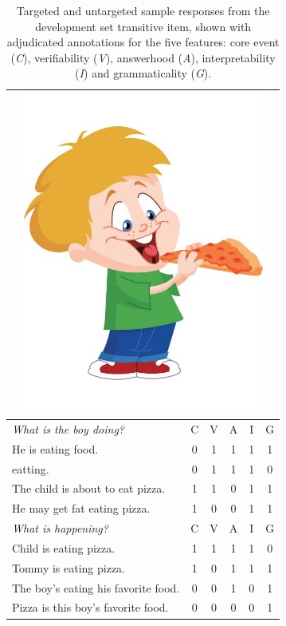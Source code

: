 \begin{table}[htb!]
\begin{center}
\begin{tabular}{|l|c|c|c|c|c|}
\hline
\multicolumn{6}{|c|}{\includegraphics[width=0.45\columnwidth]{figures/I02.jpg}} \\
\hline
\textit{What is the boy doing?} & C & V & A & I & G \\
\hline
\hline
He is eating food. & 0 & 1 & 1 & 1 & 1 \\
\hline
eatting. & 0 & 1 & 1 & 1 & 0 \\
\hline
The child is about to eat pizza. & 1 & 1 & 0 & 1 & 1 \\
\hline
He may get fat eating pizza. & 1 & 0 & 0 & 1 & 1 \\
\hline
\hline
\hline
\textit{What is happening?} & C & V & A & I & G \\
\hline
\hline
Child is eating pizza. & 1 & 1 & 1 & 1 & 0 \\
\hline
Tommy is eating pizza. & 1 & 0 & 1 & 1 & 1 \\
\hline
The boy's eating his favorite food. & 0 & 0 & 1 & 0 & 1 \\
\hline
Pizza is this boy's favorite food. & 0 & 0 & 0 & 0 & 1 \\
\hline
\end{tabular}
\caption{\label{tab:devo-transitive} Targeted and untargeted sample responses from the development set transitive item, shown with adjudicated annotations for the five features: core event (\textit{C}), verifiability (\textit{V}), answerhood (\textit{A}), interpretability (\textit{I}) and grammaticality (\textit{G}).}
\end{center}
\end{table}

